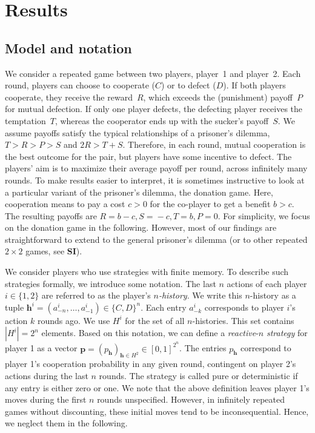 \documentclass[9pt,twocolumn,twoside]{pnas-new}
\def\SI{\textbf{SI}}
\begin{document}

\section*{Results}


\subsection*{Model and notation}
We consider a repeated game between two players, player~1 and player~2.
Each round, players can choose to cooperate ($C$) or to defect ($D$). 
If both players cooperate, they receive the reward~$R$, which exceeds the (punishment) payoff~$P$ for mutual defection. 
If only one player defects, the defecting player receives the temptation~$T$, whereas the cooperator ends up with the sucker's payoff~$S$. 
We assume payoffs satisfy the typical relationships of a prisoner's dilemma, $T \!>\! R \!>\! P \!>\! S$ and $2 R \!>\! T \!+\! S$. 
Therefore, in each round, mutual cooperation is the best outcome for the pair, but players have some incentive to defect. 
The players' aim is to maximize their average payoff per round, across infinitely many rounds.
To make results easier to interpret, it is sometimes instructive to look at a particular variant of the prisoner's dilemma, the donation game. 
Here, cooperation means to pay a cost $c\!>\!0$ for the co-player to get a benefit $b\!>\!c$.
The resulting payoffs are \(R \!\!=\! b\! -\! c, S \!=\! -c, T \!=\! b, P\!
=\! 0\). 
For simplicity, we focus on the donation game in the following. 
However, most of our findings are straightforward to extend to the general prisoner's dilemma (or to other repeated $2\!\times\!2$ games, see \SI). 

We consider players who use strategies with finite memory. 
To describe such strategies formally, we introduce some notation. 
The last $n$ actions of each player  $i\! \in\! \{1, 2\}$ are referred to as the player's {\it $n$-history}. 
We write this $n$-history as a tuple $\mathbf{h}^i\!=\!(a^i_{-n},\ldots,a^i_{-1})\!\in\!\{C,D\}^n$. 
Each entry $a^i_{-k}$ corresponds to player $i$'s action $k$ rounds ago. 
We use $H^i$ for the set of all $n$-histories. 
This set contains $|H^i|\!=\!2^{n}$ elements. 
Based on this notation, we can define a {\it reactive}-$n$ {\it strategy} for player 1 as a vector $\mathbf{p}\!=\!(p_\mathbf{h})_{\mathbf{h}\in H^2} \!\in\! [0, 1]^{2^n}$. 
The entries $p_\mathbf{h}$ correspond to player 1's cooperation probability in any given round, contingent on player 2's actions during the last $n$ rounds. 
The strategy is called pure or deterministic if any entry is either zero or one. 
We note that the above definition leaves player 1's moves during the first $n$ rounds unspecified. 
However, in infinitely repeated games without discounting, these initial moves tend to be inconsequential. 
Hence, we neglect them in the following.
\end{document}
